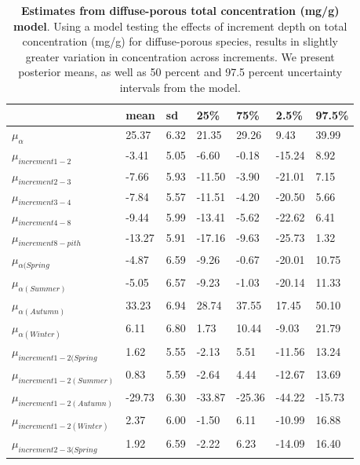\documentclass{article}\usepackage[]{graphicx}\usepackage[]{color}
\begin{document}
\begin{table}[ht]
\centering
\caption{\textbf{Estimates from diffuse-porous total concentration (mg/g) model}. Using a model testing the effects of increment depth on total concentration (mg/g) for diffuse-porous species, results in slightly greater variation in concentration across increments. We present posterior means, as well as 50 percent and 97.5 percent uncertainty intervals from the model.} 
\label{tab:difftot}
\begingroup\footnotesize
\begin{tabular}{|p{}|p{}|p{}|p{}|p{}|p{}|p{}|}
  \hline
 & mean & sd & 25\% & 75\% & 2.5\% & 97.5\% \\ 
  \hline
$\mu_{\alpha}$ & 25.37 & 6.32 & 21.35 & 29.26 & 9.43 & 39.99 \\ 
  $\mu_{increment 1-2}$ & -3.41 & 5.05 & -6.60 & -0.18 & -15.24 & 8.92 \\ 
  $\mu_{increment 2-3}$ & -7.66 & 5.93 & -11.50 & -3.90 & -21.01 & 7.15 \\ 
  $\mu_{increment 3-4}$ & -7.84 & 5.57 & -11.51 & -4.20 & -20.50 & 5.66 \\ 
  $\mu_{increment 4-8}$ & -9.44 & 5.99 & -13.41 & -5.62 & -22.62 & 6.41 \\ 
  $\mu_{increment 8-pith}$ & -13.27 & 5.91 & -17.16 & -9.63 & -25.73 & 1.32 \\ 
  $\mu_{\alpha (Spring}$ & -4.87 & 6.59 & -9.26 & -0.67 & -20.01 & 10.75 \\ 
  $\mu_{\alpha (Summer)}$ & -5.05 & 6.57 & -9.23 & -1.03 & -20.14 & 11.33 \\ 
  $\mu_{\alpha (Autumn)}$ & 33.23 & 6.94 & 28.74 & 37.55 & 17.45 & 50.10 \\ 
  $\mu_{\alpha (Winter)}$ & 6.11 & 6.80 & 1.73 & 10.44 & -9.03 & 21.79 \\ 
  $\mu_{increment 1-2 (Spring}$ & 1.62 & 5.55 & -2.13 & 5.51 & -11.56 & 13.24 \\ 
  $\mu_{increment 1-2 (Summer)}$ & 0.83 & 5.59 & -2.64 & 4.44 & -12.67 & 13.69 \\ 
  $\mu_{increment 1-2 (Autumn)}$ & -29.73 & 6.30 & -33.87 & -25.36 & -44.22 & -15.73 \\ 
  $\mu_{increment 1-2 (Winter)}$ & 2.37 & 6.00 & -1.50 & 6.11 & -10.99 & 16.88 \\ 
  $\mu_{increment 2-3 (Spring}$ & 1.92 & 6.59 & -2.22 & 6.23 & -14.09 & 16.40 \\ 

\end{tabular}
\end{table}
\end{document}
